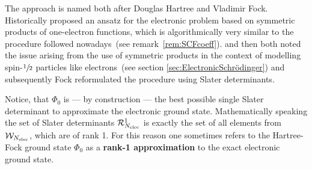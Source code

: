The \HF approach is named both
after Douglas Hartree and Vladimir Fock.
Historically \citet{Hartree1928} proposed
an ansatz for the electronic problem
based on symmetric products of one-electron functions, which is algorithmically very similar to the procedure followed
nowadays~(see remark~\vref{rem:SCFcoeff}).
\citet{Slater1930a}
and \citet{Fock1930} then both noted
the issue arising from the use of symmetric
products in the context of modelling spin-$\sfrac12$ particles like electrons~(see section \vref{sec:ElectronicSchrödinger})
and subsequently Fock reformulated the procedure
using Slater determinants.

Notice, that $\Phi_0$ is --- by construction ---
the best possible single Slater determinant to
approximate the electronic ground state.
Mathematically speaking the set of Slater determinants
$\mathcal{R}^1_{N_\text{elec}}$
is exactly the set of all elements from $\mathcal{W}_{N_\text{elec}}$,
which are of rank 1.
For this reason one sometimes refers to the Hartree-Fock
ground state $\Phi_0$
as a \textbf{rank-1 approximation} to the exact
electronic ground state.

